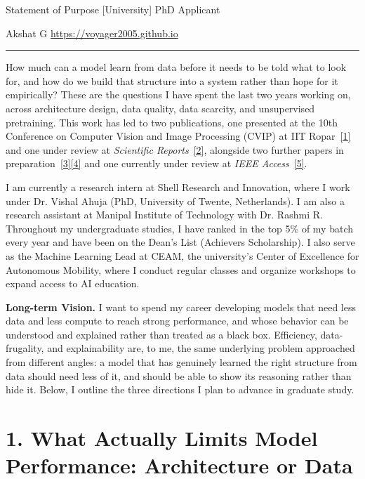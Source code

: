 \documentclass[11pt]{article}
\begin{document}
{\small Statement of Purpose \hfill [University] PhD Applicant \par}
{\small Akshat G \hfill \url{https://voyager2005.github.io} \par}
\vspace{4pt}
\hrule
\vspace{8pt}

How much can a model learn from data before it needs to be told what to look for, and how do we build that structure into a system rather than hope for it empirically? These are the questions I have spent the last two years working on, across architecture design, data quality, data scarcity, and unsupervised pretraining. This work has led to two publications, one presented at the 10th Conference on Computer Vision and Image Processing (CVIP) at IIT Ropar~\hyperref[ref1]{[1]} and one under review at \emph{Scientific Reports}~\hyperref[ref2]{[2]}, alongside two further papers in preparation~\hyperref[ref3]{[3]}\hyperref[ref4]{[4]} and one currently under review at \emph{IEEE Access}~\hyperref[ref5]{[5]}.

I am currently a research intern at Shell Research and Innovation, where I work under Dr. Vishal Ahuja (PhD, University of Twente, Netherlands). I am also a research assistant at Manipal Institute of Technology with Dr. Rashmi R. Throughout my undergraduate studies, I have ranked in the top 5\% of my batch every year and have been on the Dean's List (Achievers Scholarship). I also serve as the Machine Learning Lead at CEAM, the university's Center of Excellence for Autonomous Mobility, where I conduct regular classes and organize workshops to expand access to AI education.

\textbf{Long-term Vision.} I want to spend my career developing models that need less data and less compute to reach strong performance, and whose behavior can be understood and explained rather than treated as a black box. Efficiency, data-frugality, and explainability are, to me, the same underlying problem approached from different angles: a model that has genuinely learned the right structure from data should need less of it, and should be able to show its reasoning rather than hide it. Below, I outline the three directions I plan to advance in graduate study.

\section*{1. What Actually Limits Model Performance: Architecture or Data}
\end{document}
